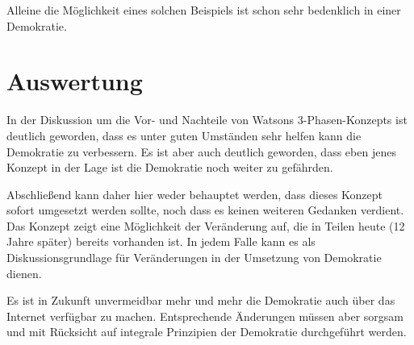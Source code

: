 \documentclass[12pt,twoside,ngerman]{scrartcl}
\theoremstyle{plain}
\theoremstyle{definition}
\theoremstyle{remark}
\begin{document}
	Alleine die Möglichkeit eines solchen Beispiels ist schon sehr bedenklich in einer Demokratie.
\section{Auswertung}
\label{sec:concl}

	In der Diskussion um die Vor- und Nachteile von Watsons 3-Phasen-Konzepts ist deutlich geworden, dass es unter guten Umständen sehr helfen kann die Demokratie zu verbessern. Es ist aber auch deutlich geworden, dass eben jenes Konzept in der Lage ist die Demokratie noch weiter zu gefährden.
	
	Abschließend kann daher hier weder behauptet werden, dass dieses Konzept sofort umgesetzt werden sollte, noch dass es keinen weiteren Gedanken verdient. Das Konzept zeigt eine Möglichkeit der Veränderung auf, die in Teilen heute (12 Jahre später) bereits vorhanden ist. In jedem Falle kann es als Diskussionsgrundlage für Veränderungen in der Umsetzung von Demokratie dienen.
	
	Es ist in Zukunft unvermeidbar mehr und mehr die Demokratie auch über das Internet verfügbar zu machen. Entsprechende Änderungen müssen aber sorgsam und mit Rücksicht auf integrale Prinzipien der Demokratie durchgeführt werden.

%
%
\clearpage


\end{document}
